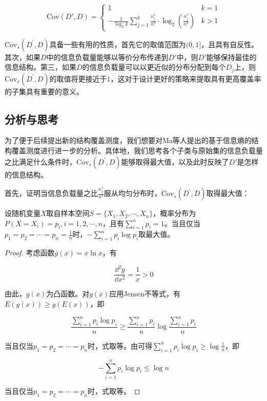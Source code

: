 \documentclass{../notes}
\newcommand{\Cov}{\text{Cov}}
\begin{document}
    \begin{equation}
        \Cov (D', D) = \begin{cases}
            1 & k=1 \\
            -\frac{1}{\log_2 k}\sum_{j=1}^k \frac{n_j^v}{n^v}\cdot \log_2\left(\frac{n_j^v}{n^v}\right) & k > 1
        \end{cases}
        \label{eq:1}
    \end{equation}

    $\Cov_s(D^\prime,D)$具备一些有用的性质，首先它的取值范围为$(0,1]$，且具有自反性。其次，如果$D$中的信息负载量能够以等价分布传递到$D'$中，则$D'$能够保持最佳的信息结构。第三，如果$D$的信息负载量可以以更近似的分布分配到每个$D_j$上，则$\Cov_s(D^\prime,D)$的取值将更接近于$1$，这对于设计更好的策略来提取具有更高覆盖率的子集具有重要的意义。

    \subsection{分析与思考}

    为了便于后续提出新的结构覆盖测度，我们想要对Ma等人提出的基于信息熵的结构覆盖测度进行进一步的分析。具体地，我们思考各个子类与原始集的信息负载量之比满足什么条件时，$\Cov_s(D^\prime,D)$能够取得最大值，以及此时反映了$D'$是怎样的信息结构。

    首先，证明当信息负载量之比$\frac{n_j^v}{n^v}$服从均匀分布时，$\Cov_s(D^\prime,D)$取得最大值：

    \begin{lemma}
        设随机变量$X$取自样本空间$S = \{X_1, X_2, \cdots, X_n\}$，概率分布为$P(X = X_i) = p_i, i=1, 2, \cdots, n$，且有$\sum_{i=1}^n p_i = 1$。当且仅当$p_1 = p_2 = \cdots = p_n = \frac{1}{n}$时，$-\sum_{i=1}^n p_{i}\log p_i$取最大值。
    \end{lemma}

    \begin{proof}
        考虑函数$g(x) = x\ln x$，有

        \begin{equation}
            \frac{\dd^2 g}{\dd x^2} = \frac{1}{x} > 0
        \end{equation}

        由此，$g(x)$为凸函数。对$g(x)$应用Jensen不等式，有$E(g(x)) \geq g(E(x))$，即

        \begin{equation}
            \frac{\sum_{i=1}^n p_i\log p_i}{n}\geq \frac{\sum_{i=1}^n p_i}{n}\log \frac{\sum_{i=1}^n p_i}{n}
            \label{eq:2}
        \end{equation}

        当且仅当$p_1 = p_2 = \cdots = p_n$时，式取等。由可得$\sum_{i=1}^n p_i\log p_i\geq \log \frac{1}{n}$，即

        \begin{equation}
            -\sum_{i=1}^n p_i\log p_i \leq \log n
            \label{eq:3}
        \end{equation}

        当且仅当$p_1 = p_2 = \cdots = p_n$时，式取等。
    \end{proof}
\end{document}
